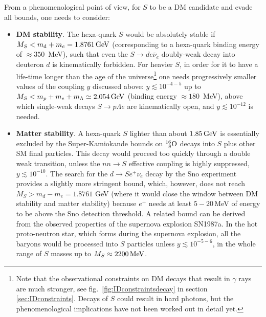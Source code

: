 \smallskip

From a phenomenological point of view, for $S$ to be a DM candidate and evade all bounds, one needs to consider:
\begin{itemize}
\item[$\blacktriangleright$]  {\bf DM stability}.
The hexa-quark $S$ would be absolutely stable if $M_S < m_{\rm d} + m_e=1.8761\,{\rm GeV}$ 
(corresponding to a hexa-quark binding energy of $\approx 350$\, MeV),
such that even the  $S\to d e \bar\nu_e$ doubly-weak decay into deuteron $d$ is kinematically  forbidden.
For heavier $S$, in order for it to have a life-time longer than the age of the universe\footnote{Note that the observational constraints on DM decays that result in $\gamma$ rays 
are much stronger, see fig.~\ref{fig:IDconstraintsdecay} in section \ref{sec:IDconstraints}. Decays of $S$ could result in hard photons, but the phenomenological implications have not been worked out in detail yet. }
one needs progressively smaller values of the coupling $y$ discussed above: $y \lesssim 10^{-4-5}$ up to 
$M_S < m_p+m_e+m_\Lambda \simeq 2.054 \,{\rm GeV}$ (binding energy $\approx 180$\, MeV), 
above which single-weak decays
$S\to p\Lambda e$ are kinematically open, and $y \lesssim 10^{-12}$ is needed.


\item[$\blacktriangleright$] {\bf Matter stability}.
A hexa-quark $S$ lighter than about $1.85\,{\rm GeV}$ is essentially excluded 
by the {\sc Super-Kamiokande} bounds on ${}^{16}_{\,\,\,8}{\rm O}$ 
decays into $S$ plus other SM final particles. 
This decay would proceed too quickly through a double weak transition, unless 
the $nn\to S$ effective coupling is highly suppressed,  $y\lesssim10^{-10}$. 
The search for the $d \to S e^+ \nu_e$  decay  by  the {\sc Sno} experiment provides a slightly more stringent bound, which, however, does not reach $M_S > m_d - m_e = 1.8761$ GeV (where it would close the window between DM stability and matter stability) because $e^+$ needs at least $5-20$\,MeV of energy to be above the {\sc Sno} detection threshold.
A related bound can be derived from the observed properties of the supernova explosion SN1987a. 
In the hot proto-neutron star, which forms during the supernova explosion, 
all the baryons would be processed into $S$ particles 
unless $y\lesssim10^{-5-6}$, in the whole range of $S$ masses up to $M_S\approx 2200\,{\rm MeV}$.



\end{itemize}
